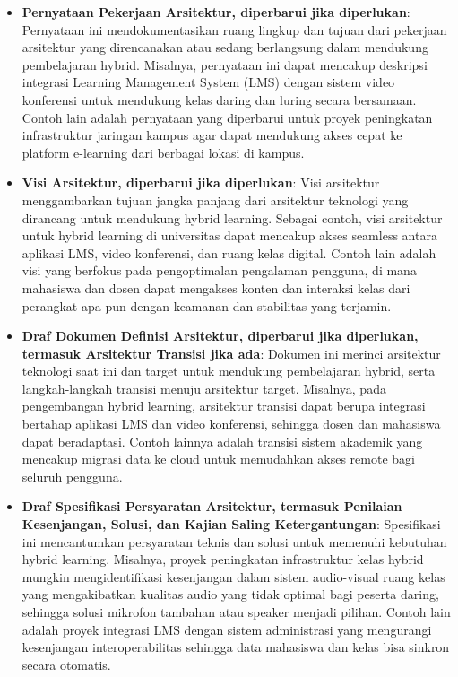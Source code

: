 \begin{itemize}
	\item \textbf{Pernyataan Pekerjaan Arsitektur, diperbarui jika diperlukan}: Pernyataan ini mendokumentasikan ruang lingkup dan tujuan dari pekerjaan arsitektur yang direncanakan atau sedang berlangsung dalam mendukung pembelajaran hybrid. Misalnya, pernyataan ini dapat mencakup deskripsi integrasi Learning Management System (LMS) dengan sistem video konferensi untuk mendukung kelas daring dan luring secara bersamaan. Contoh lain adalah pernyataan yang diperbarui untuk proyek peningkatan infrastruktur jaringan kampus agar dapat mendukung akses cepat ke platform e-learning dari berbagai lokasi di kampus.
	
	\item \textbf{Visi Arsitektur, diperbarui jika diperlukan}: Visi arsitektur menggambarkan tujuan jangka panjang dari arsitektur teknologi yang dirancang untuk mendukung hybrid learning. Sebagai contoh, visi arsitektur untuk hybrid learning di universitas dapat mencakup akses seamless antara aplikasi LMS, video konferensi, dan ruang kelas digital. Contoh lain adalah visi yang berfokus pada pengoptimalan pengalaman pengguna, di mana mahasiswa dan dosen dapat mengakses konten dan interaksi kelas dari perangkat apa pun dengan keamanan dan stabilitas yang terjamin.
	
	\item \textbf{Draf Dokumen Definisi Arsitektur, diperbarui jika diperlukan, termasuk Arsitektur Transisi jika ada}: Dokumen ini merinci arsitektur teknologi saat ini dan target untuk mendukung pembelajaran hybrid, serta langkah-langkah transisi menuju arsitektur target. Misalnya, pada pengembangan hybrid learning, arsitektur transisi dapat berupa integrasi bertahap aplikasi LMS dan video konferensi, sehingga dosen dan mahasiswa dapat beradaptasi. Contoh lainnya adalah transisi sistem akademik yang mencakup migrasi data ke cloud untuk memudahkan akses remote bagi seluruh pengguna.
	
	\item \textbf{Draf Spesifikasi Persyaratan Arsitektur, termasuk Penilaian Kesenjangan, Solusi, dan Kajian Saling Ketergantungan}: Spesifikasi ini mencantumkan persyaratan teknis dan solusi untuk memenuhi kebutuhan hybrid learning. Misalnya, proyek peningkatan infrastruktur kelas hybrid mungkin mengidentifikasi kesenjangan dalam sistem audio-visual ruang kelas yang mengakibatkan kualitas audio yang tidak optimal bagi peserta daring, sehingga solusi mikrofon tambahan atau speaker menjadi pilihan. Contoh lain adalah proyek integrasi LMS dengan sistem administrasi yang mengurangi kesenjangan interoperabilitas sehingga data mahasiswa dan kelas bisa sinkron secara otomatis.
	

\end{itemize}

